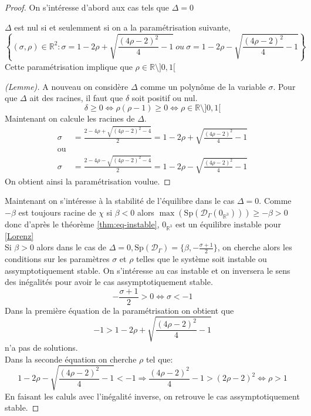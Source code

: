 \documentclass{article}
\newcommand{\R}{\mathbb{R}}
\newtheorem[M , nocut]{prop}{Proposition}[section]
\newtheorem[M , nocut]{definition}{Définition}
\newtheorem[M , nocut]{lemme}{Lemme}
\newtheorem[L , nocut]{thm}{Théoreme}
\newtheorem[M , nocut]{cor}{Corollaire}
\begin{document}
\begin{proof} %
    On s'intéresse d'abord aux cas tels que $\Delta=0$

    \begin{lemme} 
        \label{lemme:Deg0}
        $\Delta$ est nul si et seulemment si on a la paramétrisation suivante,
        \[
            \left\{(\sigma,\rho)\in \R ^2 :\sigma = 1-2 \rho + \sqrt{ \frac{(4\rho-2)^2}{4} -1 }\ ou\ \sigma = 1-2 \rho - \sqrt{ \frac{(4\rho-2)^2}{4} -1 } \right\}  
        \]
        Cette paramétrisation implique que $\rho \in \R \setminus ]0,1[$
    \end{lemme}
    
    \begin{proof}[(Lemme)]
        A nouveau on considère $\Delta$ comme un polynôme de la variable $\sigma$. Pour que $\Delta$ ait des racines, il faut que $\delta$ soit positif ou nul.
        \[
        \delta \ge 0 \Leftrightarrow \rho(\rho-1) \ge 0 \Leftrightarrow \rho \in \R \setminus ]0,1[
        \] Maintenant on calcule les racines de $\Delta$.
        \begin{align*}
            \sigma &= \frac{2-4\rho + \sqrt{ (4\rho-2)^2 -4 }}{2} = 1-2 \rho + \sqrt{ \frac{(4\rho-2)^2}{4} -1 }\\
            \text{ou}\\
            \sigma &= \frac{2-4\rho - \sqrt{ (4\rho-2)^2 -4 }}{2} = 1-2 \rho - \sqrt{ \frac{(4\rho-2)^2}{4} -1 }
        \end{align*}
        On obtient ainsi la paramétrisation voulue.
    \end{proof}
    Maintenant on s'intéresse à la stabilité de l'équilibre dans le cas $\Delta=0$. Comme $-\beta$ est toujours racine de $\chi$ si $\beta <0$ alors $\max (\mathrm{Sp}(\mathcal{D}_\Gamma (0_{\R^3}))) \ge -\beta > 0$ donc d'après le théorème \ref{thm:eq-instable}, $0_{\R^3}$ est un équilibre instable pour \eqref{Lorenz}\\
    Si $\beta > 0$ alors dans le cas de $\Delta = 0, \mathrm{Sp}(\mathcal{D}_\Gamma) = \{\beta, -\frac{\sigma+1}{2}\}$, on cherche alors les conditions sur les paramètres $\sigma$ et $\rho$ telles que le système soit instable ou assymptotiquement stable.
    On s'intéresse au cas instable et on inversera le sens des inégalités pour avoir le cas assymptotiquement stable. 
    \[
        -\frac{\sigma+1}{2} >0 \Leftrightarrow \sigma < -1   
    \]
    Dans la première équation de la paramétrisation on obtient que 
    \[-1 > 1-2 \rho + \sqrt{ \frac{(4\rho-2)^2}{4} -1}\] n'a pas de solutions.\\
    Dans la seconde équation on cherche $\rho$ tel que:
    \[
        1-2 \rho - \sqrt{ \frac{(4\rho-2)^2}{4} -1 } < -1 \Rightarrow \frac{(4\rho-2)^2}{4} -1 > (2\rho-2)^2 \Leftrightarrow \rho > 1 
    \]En faisant les caluls avec l'inégalité inverse, on retrouve le cas assymptotiquement stable.
\end{proof}
\end{document}
